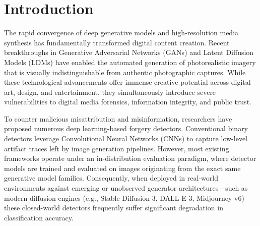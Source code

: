\documentclass[pdflatex,sn-mathphys-num]{sn-jnl}
\theoremstyle{thmstyleone}
\theoremstyle{thmstyletwo}
\theoremstyle{thmstylethree}
\begin{document}

\maketitle

\section{Introduction}\label{sec1}

The rapid convergence of deep generative models and high-resolution media synthesis has fundamentally transformed digital content creation. Recent breakthroughs in Generative Adversarial Networks (GANs) \cite{biggan2019} and Latent Diffusion Models (LDMs) \cite{stablediffusion2022} have enabled the automated generation of photorealistic imagery that is visually indistinguishable from authentic photographic captures. While these technological advancements offer immense creative potential across digital art, design, and entertainment, they simultaneously introduce severe vulnerabilities to digital media forensics, information integrity, and public trust.

To counter malicious misattribution and misinformation, researchers have proposed numerous deep learning-based forgery detectors. Conventional binary detectors leverage Convolutional Neural Networks (CNNs) \cite{resnet2016,convnext2022} to capture low-level artifact traces left by image generation pipelines. However, most existing frameworks operate under an in-distribution evaluation paradigm, where detector models are trained and evaluated on images originating from the exact same generative model families. Consequently, when deployed in real-world environments against emerging or unobserved generator architectures—such as modern diffusion engines (e.g., Stable Diffusion 3, DALL-E 3, Midjourney v6)—these closed-world detectors frequently suffer significant degradation in classification accuracy.
\end{document}
